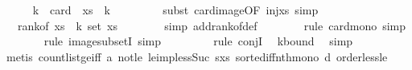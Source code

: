 \begin{isabellebody}
\isanewline
\ \ \ \ \isamarkupfalse%
\ {\isachardoublequoteopen}k{\isacharplus}{\kern0pt}{}\ {\isacharequal}{\kern0pt}\ card\ {\isacharparenleft}{\kern0pt}{\isacharparenleft}{\kern0pt}{\isacharbang}{\kern0pt}{\isacharparenright}{\kern0pt}\ xs\ {\isacharbackquote}{\kern0pt}\ {\isacharbraceleft}{\kern0pt}{}{\isachardot}{\kern0pt}{\isachardot}{\kern0pt}k{\isacharbraceright}{\kern0pt}{\isacharparenright}{\kern0pt}{\isachardoublequoteclose}\ \isanewline
\ \ \ \ \ \ \isamarkupfalse%
\ {\isacharparenleft}{\kern0pt}subst\ card{\isacharunderscore}{\kern0pt}image{\isacharbrackleft}{\kern0pt}OF\ inj{\isacharunderscore}{\kern0pt}xs{\isacharbrackright}{\kern0pt}{\isacharcomma}{\kern0pt}\ simp{\isacharparenright}{\kern0pt}\isanewline
\ \ \ \ \isamarkupfalse%
\ \isamarkupfalse%
\ {\isachardoublequoteopen}{\isachardot}{\kern0pt}{\isachardot}{\kern0pt}{\isachardot}{\kern0pt}\ {\isasymle}\ rank{\isacharunderscore}{\kern0pt}of\ {\isacharparenleft}{\kern0pt}xs\ {\isacharbang}{\kern0pt}\ {\isacharparenleft}{\kern0pt}k{\isacharplus}{\kern0pt}{}{\isacharparenright}{\kern0pt}{\isacharparenright}{\kern0pt}\ {\isacharparenleft}{\kern0pt}set\ xs{\isacharparenright}{\kern0pt}{\isachardoublequoteclose}\isanewline
\ \ \ \ \ \ \isamarkupfalse%
\ {\isacharparenleft}{\kern0pt}simp\ add{\isacharcolon}{\kern0pt}rank{\isacharunderscore}{\kern0pt}of{\isacharunderscore}{\kern0pt}def{\isacharparenright}{\kern0pt}\isanewline
\ \ \ \ \ \ \isamarkupfalse%
\ {\isacharparenleft}{\kern0pt}rule\ card{\isacharunderscore}{\kern0pt}mono{\isacharcomma}{\kern0pt}\ simp{\isacharparenright}{\kern0pt}\isanewline
\ \ \ \ \ \ \isamarkupfalse%
\ {\isacharparenleft}{\kern0pt}rule\ image{\isacharunderscore}{\kern0pt}subsetI{\isacharcomma}{\kern0pt}\ simp{\isacharparenright}{\kern0pt}\ \isanewline
\ \ \ \ \ \ \isamarkupfalse%
\ {\isacharparenleft}{\kern0pt}rule\ conjI{\isacharparenright}{\kern0pt}\ \isamarkupfalse%
\ k{\isacharunderscore}{\kern0pt}bound\ \isamarkupfalse%
\ simp\isanewline
\ \ \ \ \ \ \isamarkupfalse%
\ {\isacharparenleft}{\kern0pt}metis\ count{\isacharunderscore}{\kern0pt}list{\isacharunderscore}{\kern0pt}ge{\isacharunderscore}{\kern0pt}{}{\isacharunderscore}{\kern0pt}iff\ a{\isacharunderscore}{\kern0pt}{}\ not{\isacharunderscore}{\kern0pt}le\ le{\isacharunderscore}{\kern0pt}imp{\isacharunderscore}{\kern0pt}less{\isacharunderscore}{\kern0pt}Suc\ s{\isacharunderscore}{\kern0pt}xs\ sorted{\isacharunderscore}{\kern0pt}iff{\isacharunderscore}{\kern0pt}nth{\isacharunderscore}{\kern0pt}mono\ d\ order{\isacharunderscore}{\kern0pt}less{\isacharunderscore}{\kern0pt}le{\isacharparenright}{\kern0pt}\isanewline

\end{isabellebody}
